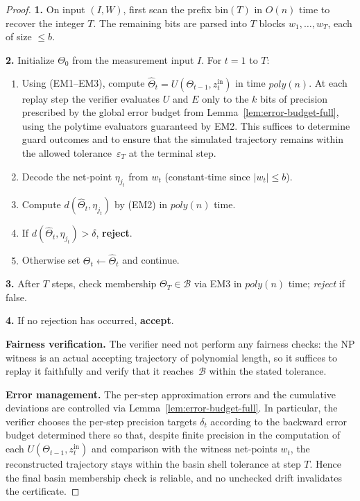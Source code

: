 \documentclass[12pt]{article}
\theoremstyle{definition}
\theoremstyle{plain}
\begin{document}
\begin{proof}
\textbf{1.}  On input \((I,W)\), first scan the prefix \(\mathrm{bin}(T)\) in \(O(n)\) time to recover the integer \(T\).  The remaining bits are parsed into \(T\) blocks \(w_1,\dots,w_T\), each of size \(\le b\).

\textbf{2.}  Initialize \(\Theta_0\) from the measurement input \(I\).  
For \(t=1\) to \(T\):
\begin{enumerate}
  \item Using (EM1–EM3), compute \(\widehat\Theta_t = U(\Theta_{t-1},z^{\mathrm{in}}_t)\) in time \(poly(n)\). At each replay step the verifier evaluates $U$ and $E$ only to the $k$ bits of precision prescribed by the global error budget from Lemma~\ref{lem:error-budget-full}, using the polytime evaluators guaranteed by EM2. This suffices to determine guard outcomes and to ensure that the simulated trajectory remains within the allowed tolerance~$\varepsilon_T$ at the terminal step.

  \item Decode the net‑point \(\eta_{j_t}\) from \(w_t\) (constant‑time since \(|w_t|\le b\)).
  \item Compute \(d(\widehat\Theta_t,\eta_{j_t})\) by (EM2) in \(poly(n)\) time.
  \item If \(d(\widehat\Theta_t,\eta_{j_t})>\delta\), \textbf{reject}.
  \item Otherwise set \(\Theta_t \leftarrow \widehat\Theta_t\) and continue.
\end{enumerate}

\textbf{3.}  After \(T\) steps, check membership \(\Theta_T\in\mathcal B\) via EM3 in \(poly(n)\) time; \emph{reject} if false.

\textbf{4.}  If no rejection has occurred, \textbf{accept}.  

\medskip\noindent\textbf{Fairness verification.}  
The verifier need not perform any fairness checks: the NP witness is an actual accepting trajectory of polynomial length, so it suffices to replay it faithfully and verify that it reaches~$\mathcal{B}$ within the stated tolerance.


\medskip\noindent\textbf{Error management.}  
The per-step approximation errors and the cumulative deviations are controlled via Lemma~\ref{lem:error-budget-full}.  In particular, the verifier chooses the per-step precision targets \(\delta_t\) according to the backward error budget determined there so that, despite finite precision in the computation of each \(U(\Theta_{t-1},z^{\mathrm{in}}_t)\) and comparison with the witness net-points \(w_t\), the reconstructed trajectory stays within the basin shell tolerance at step \(T\).  Hence the final basin membership check is reliable, and no unchecked drift invalidates the certificate.



\end{proof}
\end{document}
